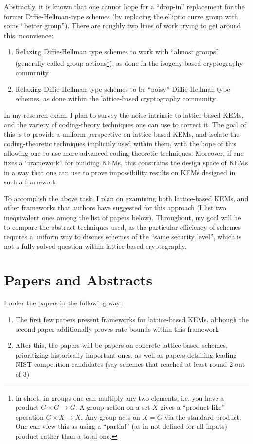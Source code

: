 \documentclass{article}
\begin{document}
	Abstractly, it is known that one cannot hope for a ``drop-in'' replacement for the former Diffie-Hellman-type schemes (by replacing the elliptic curve group with some ``better group'').
	There are roughly two lines of work trying to get around this inconvience:
	\begin{enumerate}
		\item Relaxing Diffie-Hellman type schemes to work with ``almost groups'' (generally called group actions\footnote{In short, in groups one can multiply any two elements, i.e. you have a product $G\times G\to G$.
		A group action on a set $X$ gives a ``product-like'' operation $G\times X\to X$.
	Any group acts on $X = G$ via the standard product.
One can view this as using a ``partial'' (as in not defined for all inputs) product rather than a total one.}), as done in the isogeny-based cryptography community
		\item Relaxing Diffie-Hellman type schemes to be ``noisy'' Diffie-Hellman type schemes, as done within the lattice-based cryptography community
	\end{enumerate}
	In my research exam, I plan to survey the noise intrinsic to lattice-based KEMs, and the variety of coding-theory techniques one can use to correct it.
	The goal of this is to provide a uniform perspective on lattice-based KEMs, and isolate the coding-theoretic techniques implicitly used within them, with the hope of this allowing one to use more advanced coding-theoretic techniques.
	Moreover, if one fixes a ``framework'' for building KEMs, this constrains the design space of KEMs in a way that one can use to prove impossibility results on KEMs designed in such a framework.
	
	To accomplish the above task, I plan on examining both lattice-based KEMs, and other frameworks that authors have suggested for this approach (I list two inequivalent ones among the list of papers below).
	Throughout, my goal will be to compare the abstract techniques used, as the particular efficiency of schemes requires a uniform way to discuss schemes of the ``same security level'', which is not a fully solved question within lattice-based cryptography.
	
	\section{Papers and Abstracts}
	I order the papers in the following way:
	\begin{enumerate}
		\item The first few papers present frameworks for lattice-based KEMs, although the second paper additionally proves rate bounds within this framework
		\item After this, the papers will be papers on concrete lattice-based schemes, prioritizing historically important ones, as well as papers detailing leading NIST competition candidates (say schemes that reached at least round 2 out of 3)
	\end{enumerate}
\end{document}
